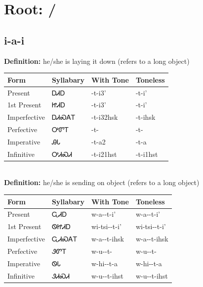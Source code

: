 \documentclass{article}%
\begin{document}
%
\normalsize%
\section*{Root:  / }%
\subsection*{i-a-i}%
\textbf{Definition: }%
he/she is laying it down (refers to a long object)%
\\[0.5em]%
\begin{tabular}{|l|l|l|l|}%
\hline%
\textbf{Form}&\textbf{Syllabary}&\textbf{With Tone}&\textbf{Toneless}\\%
\hline%
Present&ᎠᏗᎠ&{-}t{-}i3'&{-}t{-}i'\\%
1st Present&ᏥᏗᎠ&{-}t{-}i3'&{-}t{-}i'\\%
Imperfective&ᎠᏗᏍᎪᎢ&{-}t{-}i32hsk&{-}t{-}ihsk\\%
Perfective&ᎤᏛᎢ&{-}t{-}&{-}t{-}\\%
Imperative&ᎯᏓ&{-}t{-}a2&{-}t{-}a\\%
Infinitive&ᎤᏗᏍᏗ&{-}t{-}i21hst&{-}t{-}i1hst\\%
\hline%
\end{tabular}%
\\[1em]%
\textbf{Definition: }%
he/she is sending on object (refers to a long object)%
\\[0.5em]%
\begin{tabular}{|l|l|l|l|}%
\hline%
\textbf{Form}&\textbf{Syllabary}&\textbf{With Tone}&\textbf{Toneless}\\%
\hline%
Present&ᏩᏗᎠ&w{-}a{-}{-}t{-}i'&w{-}a{-}{-}t{-}i'\\%
1st Present&ᏫᏥᏗᎠ&wi{-}tsi{-}{-}t{-}i'&wi{-}tsi{-}{-}t{-}i'\\%
Imperfective&ᏩᏗᏍᎪᎢ&w{-}a{-}{-}t{-}ihsk&w{-}a{-}{-}t{-}ihsk\\%
Perfective&ᏭᏛᎢ&w{-}u{-}{-}t{-}&w{-}u{-}{-}t{-}\\%
Imperative&ᏫᏓ&w{-}hi{-}{-}t{-}a&w{-}hi{-}{-}t{-}a\\%
Infinitive&ᏭᏗᏍᏗ&w{-}u{-}{-}t{-}ihst&w{-}u{-}{-}t{-}ihst\\%
\hline%
\end{tabular}%
\\[1em]%
\end{document}
